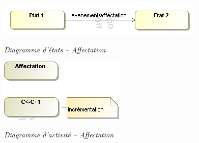 \documentclass[10pt,fleqn]{article} %
\begin{document}
\begin{minipage}[c]{.48\linewidth}
\begin{center}
\includegraphics[width=\textwidth]{images/Affectation_stm}

\textit{Diagramme d'états -- Affectation}
\end{center}
\end{minipage} \hfill
\begin{minipage}[c]{.48\linewidth}
\begin{center}
\includegraphics[width=.6\textwidth]{images/Affectation_act}

\textit{Diagramme d'activité -- Affectation}
\end{center}
\end{minipage}
\end{document}
